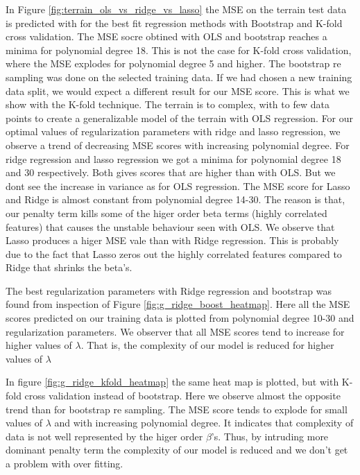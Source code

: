 In Figure \ref{fig:terrain_ols_vs_ridge_vs_lasso} the MSE on the terrain test
data is predicted with for the best fit regression methods with Bootstrap and
K-fold cross validation. The MSE socre obtined with OLS and bootstrap reaches a minima for
polynomial degree 18. This is not the case for K-fold cross validation, where
the MSE explodes for polynomial degree 5 and higher. The bootstrap re sampling
was done on the selected training data. If we had chosen a new training data split,
we would expect a different result for our MSE score. This is what we show with
the K-fold technique. The terrain is to complex, with to few data points to
create a generalizable model of the terrain with OLS regression. For our
optimal values of regularization parameters with ridge and lasso regression, we
observe a trend of decreasing MSE scores with increasing polynomial degree. For
ridge regression  and lasso regression we got a minima for polynomial degree 18
and 30 respectively. Both gives scores that are higher than with OLS. But we
dont see the increase in variance as for OLS regression. The MSE score for
Lasso and Ridge is almost constant from polynomial degree 14-30. The reason is
that, our
penalty term kills some of the higer order beta terms (highly correlated
features) that causes the unstable %
behaviour seen with OLS. We observe that Lasso produces a higer MSE vale than
with
Ridge regression. This is probably due to the fact that Lasso zeros out the highly correlated
features compared to Ridge that shrinks the beta's. 

The best regularization parameters with Ridge regression and bootstrap was found from
inspection of Figure \ref{fig:g_ridge_boost_heatmap}. Here all the MSE scores
predicted on our training data is plotted from polynomial degree 10-30 and
regularization parameters. We observer that all MSE scores tend to increase for
higher values of $\lambda $. That is, the complexity of our model is reduced
for higher values of $\lambda $

In figure \ref{fig:g_ridge_kfold_heatmap} the same heat map is plotted, but
with K-fold cross validation instead of bootstrap. Here we observe almost the
opposite trend than for bootstrap re sampling. The MSE score tends to explode for
small values of $\lambda $ and with increasing polynomial degree. It 
indicates that complexity of data is not well represented by the higer order
$\beta $'s. Thus, by intruding more dominant penalty term the complexity of our
model is reduced and we don't get a problem with over fitting. 

